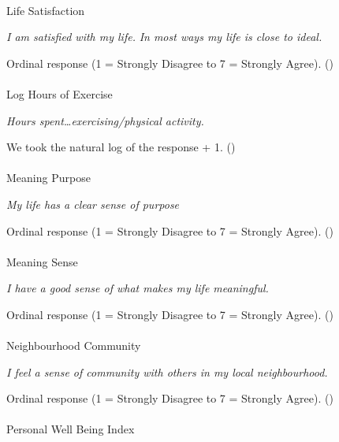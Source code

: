 \documentclass[
  single column]{article}
\makeatletter
\let\oldparagraph\paragraph
\renewcommand{\paragraph}{
    \@ifstar
      \xxxParagraphStar
      \xxxParagraphNoStar
  }
\newcommand{\xxxParagraphStar}[1]{\oldparagraph*{#1}\mbox{}}
\newcommand{\xxxParagraphNoStar}[1]{\oldparagraph{#1}\mbox{}}
\makeatother
\begin{document}
\paragraph{Life Satisfaction}\label{life-satisfaction}

\emph{I am satisfied with my life.} \emph{In most ways my life is close
to ideal.}

Ordinal response (1 = Strongly Disagree to 7 = Strongly Agree).
()

\paragraph{Log Hours of Exercise}\label{log-hours-of-exercise-1}

\emph{Hours spent\ldots exercising/physical activity.}

We took the natural log of the response + 1.
()

\paragraph{Meaning Purpose}\label{meaning-purpose}

\emph{My life has a clear sense of purpose}

Ordinal response (1 = Strongly Disagree to 7 = Strongly Agree).
()

\paragraph{Meaning Sense}\label{meaning-sense}

\emph{I have a good sense of what makes my life meaningful.}

Ordinal response (1 = Strongly Disagree to 7 = Strongly Agree).
()

\paragraph{Neighbourhood Community}\label{neighbourhood-community}

\emph{I feel a sense of community with others in my local
neighbourhood.}

Ordinal response (1 = Strongly Disagree to 7 = Strongly Agree).
()

\paragraph{Personal Well Being Index}\label{personal-well-being-index}
\end{document}
